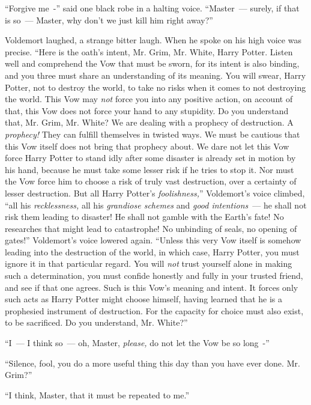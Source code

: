 ``Forgive me~-'' said one black robe in a halting voice. ``Master~--- surely, if that is so~--- Master, why don't we just kill him right away?''

Voldemort laughed, a strange bitter laugh. When he spoke on his high voice was precise. ``Here is the oath's intent, Mr. Grim, Mr. White, Harry Potter. Listen well and comprehend the Vow that must be sworn, for its intent is also binding, and you three must share an understanding of its meaning. You will swear, Harry Potter, not to destroy the world, to take no risks when it comes to not destroying the world. This Vow may \emph{not} force you into any positive action, on account of that, this Vow does not force your hand to any stupidity. Do you understand that, Mr. Grim, Mr. White? We are dealing with a prophecy of destruction. A \emph{prophecy!} They can fulfill themselves in twisted ways. We must be cautious that this Vow itself does not bring that prophecy about. We dare not let this Vow force Harry Potter to stand idly after some disaster is already set in motion by his hand, because he must take some lesser risk if he tries to stop it. Nor must the Vow force him to choose a risk of truly vast destruction, over a certainty of lesser destruction. But all Harry Potter's \emph{foolishness,}'' Voldemort's voice climbed, ``all his \emph{recklessness,} all his \emph{grandiose schemes} and \emph{good intentions}~--- he shall not risk them leading to disaster! He shall not gamble with the Earth's fate! No researches that might lead to catastrophe! No unbinding of seals, no opening of gates!'' Voldemort's voice lowered again. ``Unless this very Vow itself is somehow leading into the destruction of the world, in which case, Harry Potter, you must ignore it in that particular regard. You will \emph{not} trust yourself alone in making such a determination, you must confide honestly and fully in your trusted friend, and see if that one agrees. Such is this Vow's meaning and intent. It forces only such acts as Harry Potter might choose himself, having learned that he is a prophesied instrument of destruction. For the capacity for choice must also exist, to be sacrificed. Do you understand, Mr. White?''

``I~--- I think so~--- oh, Master, \emph{please,} do not let the Vow be so long~-''

``Silence, fool, you do a more useful thing this day than you have ever done. Mr. Grim?''

``I think, Master, that it must be repeated to me.''

